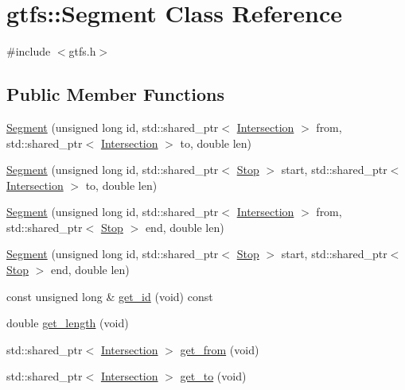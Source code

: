 \hypertarget{classgtfs_1_1Segment}{}\section{gtfs\+:\+:Segment Class Reference}
\label{classgtfs_1_1Segment}


{\ttfamily \#include $<$gtfs.\+h$>$}

\subsection*{Public Member Functions}
\begin{DoxyCompactItemize}
\item 
\hyperlink{classgtfs_1_1Segment_a3ffae4434816b887aaa0ad599ca1776a}{Segment} (unsigned long id, std\+::shared\+\_\+ptr$<$ \hyperlink{classgtfs_1_1Intersection}{Intersection} $>$ from, std\+::shared\+\_\+ptr$<$ \hyperlink{classgtfs_1_1Intersection}{Intersection} $>$ to, double len)
\item 
\hyperlink{classgtfs_1_1Segment_a20c723d86a9a716a802b81971258a8dd}{Segment} (unsigned long id, std\+::shared\+\_\+ptr$<$ \hyperlink{classgtfs_1_1Stop}{Stop} $>$ start, std\+::shared\+\_\+ptr$<$ \hyperlink{classgtfs_1_1Intersection}{Intersection} $>$ to, double len)
\item 
\hyperlink{classgtfs_1_1Segment_a9f528f4e1abd3bdca0f38b2e8ca48fc1}{Segment} (unsigned long id, std\+::shared\+\_\+ptr$<$ \hyperlink{classgtfs_1_1Intersection}{Intersection} $>$ from, std\+::shared\+\_\+ptr$<$ \hyperlink{classgtfs_1_1Stop}{Stop} $>$ end, double len)
\item 
\hyperlink{classgtfs_1_1Segment_ab3de55f7f97c97ecd4be08be380129d0}{Segment} (unsigned long id, std\+::shared\+\_\+ptr$<$ \hyperlink{classgtfs_1_1Stop}{Stop} $>$ start, std\+::shared\+\_\+ptr$<$ \hyperlink{classgtfs_1_1Stop}{Stop} $>$ end, double len)
\item 
const unsigned long \& \hyperlink{classgtfs_1_1Segment_a68a02d9941d73e46cb8be471bed620e7}{get\+\_\+id} (void) const 
\item 
double \hyperlink{classgtfs_1_1Segment_a4f42ea597e18e54c9ec506697eb333a9}{get\+\_\+length} (void)
\item 
std\+::shared\+\_\+ptr$<$ \hyperlink{classgtfs_1_1Intersection}{Intersection} $>$ \hyperlink{classgtfs_1_1Segment_ae43fcbd6aab7e468122f0110a2d60968}{get\+\_\+from} (void)
\item 
std\+::shared\+\_\+ptr$<$ \hyperlink{classgtfs_1_1Intersection}{Intersection} $>$ \hyperlink{classgtfs_1_1Segment_aba473075f7a10db66b5b99890c39852f}{get\+\_\+to} (void)

\end{DoxyCompactItemize}
